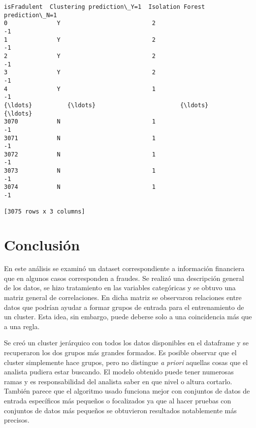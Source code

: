 \documentclass[12pt,a4paper,table]{article}
\makeatletter
\newcommand{\boxspacing}{\kern\kvtcb@left@rule\kern\kvtcb@boxsep}
\newcommand{\prompt}[4]{
        {\ttfamily\llap{{\color{#2}[#3]:\hspace{3pt}#4}}\vspace{-\baselineskip}}
    }
\makeatother
\begin{document}
            \begin{tcolorbox}[breakable, size=fbox, boxrule=.5pt, pad at break*=1mm, opacityfill=0]
\prompt{Out}{outcolor}{25}{\boxspacing}
\begin{Verbatim}[commandchars=\\\{\}]
     isFradulent  Clustering prediction\_Y=1  Isolation Forest prediction\_N=1
0              Y                          2                               -1
1              Y                          2                               -1
2              Y                          2                               -1
3              Y                          2                               -1
4              Y                          1                               -1
{\ldots}          {\ldots}                        {\ldots}                              {\ldots}
3070           N                          1                               -1
3071           N                          1                               -1
3072           N                          1                               -1
3073           N                          1                               -1
3074           N                          1                               -1

[3075 rows x 3 columns]
\end{Verbatim}
\end{tcolorbox}
        
    \hypertarget{conclusiuxf3n}{%
\section{Conclusión}\label{conclusiuxf3n}}

En este análisis se examinó un dataset correspondiente a información
financiera que en algunos casos corresponden a fraudes. Se realizó una
descripción general de los datos, se hizo tratamiento en las variables
categóricas y se obtuvo una matriz general de correlaciones. En dicha
matriz se observaron relaciones entre datos que podrían ayudar a formar
grupos de entrada para el entrenamiento de un cluster. Esta idea, sin
embargo, puede deberse solo a una coincidencia más que a una regla.

Se creó un cluster jerárquico con todos los datos disponibles en el
dataframe y se recuperaron los dos grupos más grandes formados. Es
posible observar que el cluster simplemente hace grupos, pero no
distingue \emph{a priori} aquellas cosas que el analista pudiera estar
buscando. El modelo obtenido puede tener numerosas ramas y es
responsabilidad del analista saber en que nivel o altura cortarlo.
También parece que el algoritmo usado funciona mejor con conjuntos de
datos de entrada específicos más pequeños o focalizados ya que al hacer
pruebas con conjuntos de datos más pequeños se obtuvieron resultados
notablemente más precisos.
\end{document}
